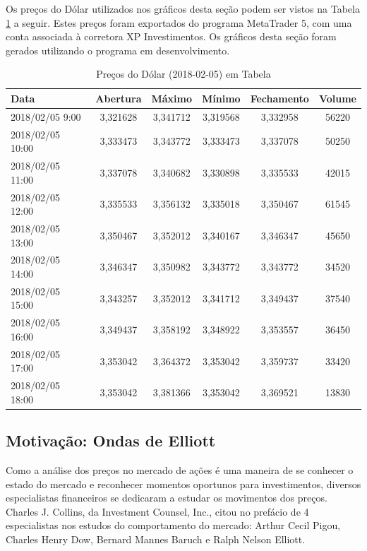 \documentclass[12pt]{article}
\begin{document}
Os preços do Dólar utilizados nos gráficos desta seção podem ser vistos na
Tabela \ref{tab:prices_table} a seguir. Estes preços foram exportados do programa
MetaTrader 5, com uma conta associada à corretora XP Investimentos. Os gráficos desta
seção foram gerados utilizando o programa em desenvolvimento.

\begin{table}[H]
	\caption{Preços do Dólar (2018-02-05) em Tabela}
	\label{tab:prices_table}
	\begin{tabular}{l c c c c c}
		\textbf{Data} & \textbf{Abertura} & \textbf{Máximo} & \textbf{Mínimo} & \textbf{Fechamento} & \textbf{Volume}\\
		\toprule
		2018/02/05 9:00 & 3,321628 & 3,341712 & 3,319568 & 3,332958 & 56220\\
		\midrule
		2018/02/05 10:00 & 3,333473 & 3,343772 & 3,333473 & 3,337078 & 50250\\
		\midrule
		2018/02/05 11:00 & 3,337078 & 3,340682 & 3,330898 & 3,335533 & 42015\\
		\midrule
		2018/02/05 12:00 & 3,335533 & 3,356132 & 3,335018 & 3,350467 & 61545\\
		\midrule
		2018/02/05 13:00 & 3,350467 & 3,352012 & 3,340167 & 3,346347 & 45650\\
		\midrule
		2018/02/05 14:00 & 3,346347 & 3,350982 & 3,343772 & 3,343772 & 34520\\
		\midrule
		2018/02/05 15:00 & 3,343257 & 3,352012 & 3,341712 & 3,349437 & 37540\\
		\midrule
		2018/02/05 16:00 & 3,349437 & 3,358192 & 3,348922 & 3,353557 & 36450\\
		\midrule
		2018/02/05 17:00 & 3,353042 & 3,364372 & 3,353042 & 3,359737 & 33420\\
		\midrule
		2018/02/05 18:00 & 3,353042 & 3,381366 & 3,353042 & 3,369521 & 13830
	\end{tabular}
\end{table}

\subsection{Motivação: Ondas de Elliott} \label{sec:Elliott-Waves}

Como a análise dos preços no mercado de ações é uma maneira de se conhecer o estado
do mercado e reconhecer momentos oportunos para investimentos, diversos especialistas
financeiros se dedicaram a estudar os movimentos dos preços. Charles J. Collins, da
Investment Counsel, Inc., citou no prefácio de \cite{PrechterFrost:2005} 4 especialistas
nos estudos do comportamento do mercado: Arthur Cecil Pigou, Charles Henry Dow,
Bernard Mannes Baruch e Ralph Nelson Elliott.
\end{document}
